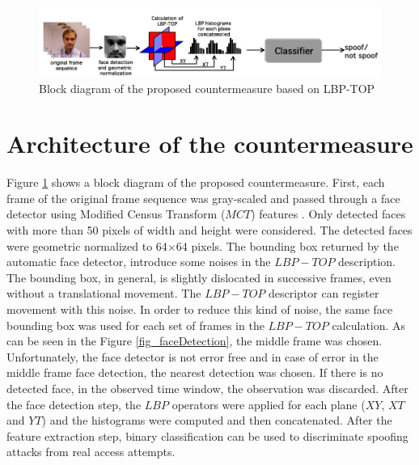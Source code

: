 
\begin{figure}[!htb]
\begin{center}
\includegraphics [width=16cm] {images/proposed_countermeasure/countermeasure_2.png}
\caption[Block diagram of the proposed countermeasure based on LBP-TOP]{Block diagram of the proposed countermeasure based on LBP-TOP} \label{fig_countermeasure}
\end{center}
\end{figure}

\section{Architecture of the countermeasure}
\label{sec_proposed_counter}

Figure \ref{fig_countermeasure} shows a block diagram of the proposed countermeasure. First, each frame of the original frame sequence was gray-scaled and passed through a face detector using Modified Census Transform ($MCT$) features \cite{froba2004face}. Only detected faces with more than 50 pixels of width and height were considered. The detected faces were geometric normalized to 64$\times$64 pixels. The bounding box returned by the automatic face detector, introduce some noises in the $LBP-TOP$ description. The bounding box, in general, is slightly dislocated in successive frames, even without a translational movement. The $LBP-TOP$ descriptor can register movement with this noise. In order to reduce this kind of noise, the same face bounding box was used for each set of frames in the $LBP-TOP$ calculation. As can be seen in the Figure \ref{fig_faceDetection}, the middle frame was chosen. Unfortunately, the face detector is not error free and in case of error in the middle frame face detection, the nearest detection was chosen. If there is no detected face, in the observed time window, the observation was discarded. After the face detection step, the $LBP$ operators were applied for each plane ($XY$, $XT$ and $YT$) and the histograms were computed and then concatenated. After the feature extraction step, binary classification can be used to discriminate spoofing attacks from real access attempts.

